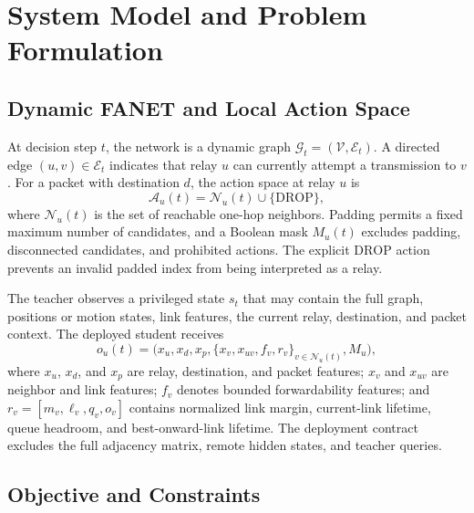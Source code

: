 \documentclass{ieeeaccess}
\newcommand{\drop}{\mathrm{DROP}}
\begin{document}
\section{System Model and Problem Formulation}

\subsection{Dynamic FANET and Local Action Space}

At decision step $t$, the network is a dynamic graph $\mathcal{G}_t=(\mathcal{V},\mathcal{E}_t)$. A directed edge $(u,v)\in\mathcal{E}_t$ indicates that relay $u$ can currently attempt a transmission to $v$. For a packet with destination $d$, the action space at relay $u$ is
\begin{equation}
\mathcal{A}_u(t)=\mathcal{N}_u(t)\cup\{\drop\},
\end{equation}
where $\mathcal{N}_u(t)$ is the set of reachable one-hop neighbors. Padding permits a fixed maximum number of candidates, and a Boolean mask $M_u(t)$ excludes padding, disconnected candidates, and prohibited actions. The explicit $\drop$ action prevents an invalid padded index from being interpreted as a relay.

The teacher observes a privileged state $s_t$ that may contain the full graph, positions or motion states, link features, the current relay, destination, and packet context. The deployed student receives
\begin{equation}
o_u(t)=\big(x_u, x_d, x_p, \{x_v,x_{uv},f_v,r_v\}_{v\in\mathcal{N}_u(t)},M_u\big),
\end{equation}
where $x_u$, $x_d$, and $x_p$ are relay, destination, and packet features; $x_v$ and $x_{uv}$ are neighbor and link features; $f_v$ denotes bounded forwardability features; and $r_v=[m_v,\ell_v,q_v,o_v]$ contains normalized link margin, current-link lifetime, queue headroom, and best-onward-link lifetime. The deployment contract excludes the full adjacency matrix, remote hidden states, and teacher queries.

\subsection{Objective and Constraints}
\end{document}
